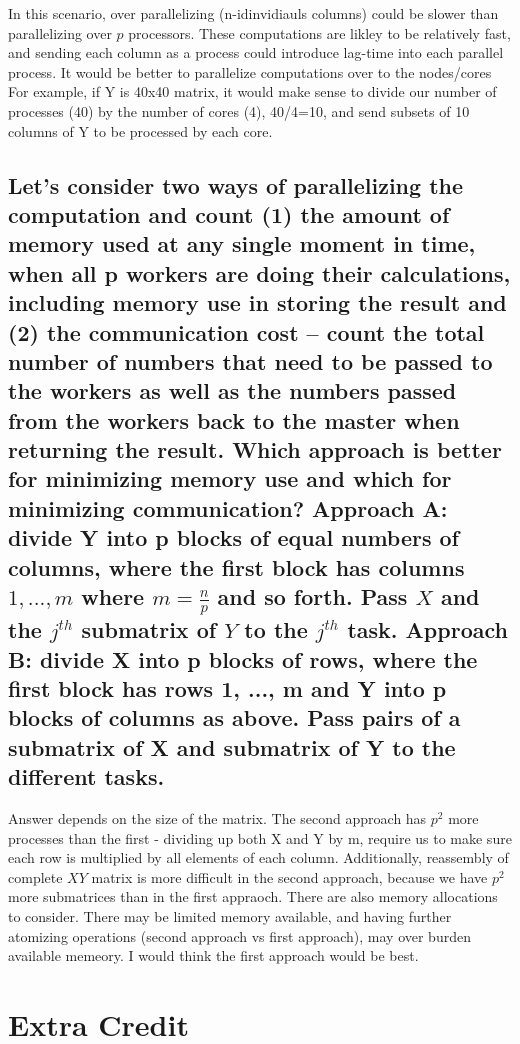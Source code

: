 \documentclass{article}\usepackage[]{graphicx}\usepackage[]{color}
\begin{document}
In this scenario, over parallelizing (n-idinvidiauls columns) could be slower than parallelizing over $p$ processors. These computations are likley to be relatively fast, and sending each column as a process could introduce lag-time into each parallel process. It would be better to parallelize computations over to the nodes/cores For example, if Y is 40x40 matrix, it would  make sense to divide our  number of processes (40) by the number of cores (4), 40/4=10, and send subsets of 10 columns of Y to be processed by each core. 

\subsection{Let’s consider two ways of parallelizing the computation and count (1) the amount of memory
used at any single moment in time, when all p workers are doing their calculations, including memory use in storing the result and (2) the communication cost – count the total number of numbers that need to be passed to the workers as well as the numbers passed from the workers back to the master when returning the result. Which approach is better for minimizing memory use and which for minimizing communication? Approach A: divide Y into p blocks of equal numbers of columns, where the first block has columns $1, ..., m$ where $m = \frac{n}{p}$ and so forth. Pass $X$ and the $j^{th}$ submatrix of $Y$ to the $j^{th}$ task. Approach B: divide X into p blocks of rows, where the first block has rows 1, ..., m and
Y into p blocks of columns as above. Pass pairs of a submatrix of X and submatrix of Y to
the different tasks.}


Answer depends on the size of the matrix. The second approach has $p^2$ more processes than the first - dividing up both X and Y by m, require us to make sure each row is multiplied by all elements of each column. Additionally, reassembly of complete $XY$ matrix is more difficult in the second approach, because we have $p^2$ more submatrices than in the first appraoch. There are also memory allocations to consider. There may be limited memory available, and having further atomizing operations (second approach vs first approach), may over burden available memeory. I would think the first approach would be best.


\section{Extra Credit}
\end{document}
